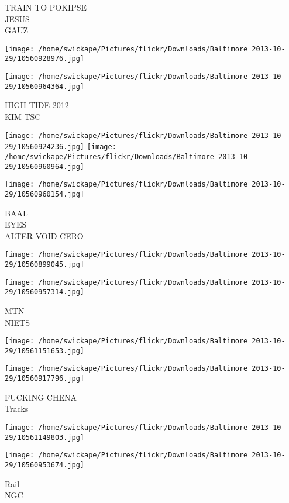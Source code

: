 \documentclass[10pt,letterpaper]{article}
\begin{document}
TRAIN TO POKIPSE\\
JESUS\\
GAUZ
\pagebreak

\texttt{[image: /home/swickape/Pictures/flickr/Downloads/Baltimore 2013-10-29/10560928976.jpg]}

\vspace{0.25in}
\texttt{[image: /home/swickape/Pictures/flickr/Downloads/Baltimore 2013-10-29/10560964364.jpg]}

HIGH TIDE 2012\\
KIM TSC
\pagebreak

\texttt{[image: /home/swickape/Pictures/flickr/Downloads/Baltimore 2013-10-29/10560924236.jpg]}
\texttt{[image: /home/swickape/Pictures/flickr/Downloads/Baltimore 2013-10-29/10560960964.jpg]}

\texttt{[image: /home/swickape/Pictures/flickr/Downloads/Baltimore 2013-10-29/10560960154.jpg]}

BAAL\\
EYES\\
ALTER VOID CERO
\pagebreak

\texttt{[image: /home/swickape/Pictures/flickr/Downloads/Baltimore 2013-10-29/10560899045.jpg]}

\vspace{0.25in}
\texttt{[image: /home/swickape/Pictures/flickr/Downloads/Baltimore 2013-10-29/10560957314.jpg]}

MTN\\
NIETS
\pagebreak

\texttt{[image: /home/swickape/Pictures/flickr/Downloads/Baltimore 2013-10-29/10561151653.jpg]}

\vspace{0.25in}
\texttt{[image: /home/swickape/Pictures/flickr/Downloads/Baltimore 2013-10-29/10560917796.jpg]}

FUCKING CHENA\\
Tracks
\pagebreak

\texttt{[image: /home/swickape/Pictures/flickr/Downloads/Baltimore 2013-10-29/10561149803.jpg]}

\vspace{0.25in}
\texttt{[image: /home/swickape/Pictures/flickr/Downloads/Baltimore 2013-10-29/10560953674.jpg]}

Rail\\
NGC
\pagebreak
\end{document}
